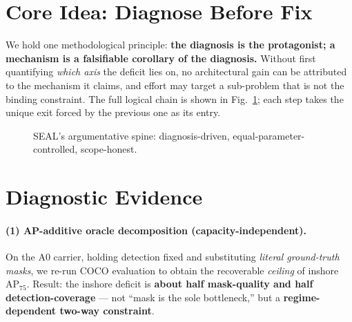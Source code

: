 \documentclass[11pt,a4paper]{article}
\begin{document}
\section{Core Idea: Diagnose Before Fix}
We hold one methodological principle: \textbf{the diagnosis is the protagonist; a mechanism is a
falsifiable corollary of the diagnosis.} Without first quantifying \emph{which axis} the deficit lies
on, no architectural gain can be attributed to the mechanism it claims, and effort may target a
sub-problem that is not the binding constraint. The full logical chain is shown in
Fig.~\ref{fig:arc}; each step takes the unique exit forced by the previous one as its entry.

\begin{figure}[h]
\centering
{}
\caption{SEAL's argumentative spine: diagnosis-driven, equal-parameter-controlled, scope-honest.}
\label{fig:arc}
\end{figure}

\section{Diagnostic Evidence}
\paragraph{(1) AP-additive oracle decomposition (capacity-independent).} On the A0 carrier, holding
detection fixed and substituting \emph{literal ground-truth masks}, we re-run COCO evaluation to obtain
the recoverable \emph{ceiling} of inshore AP$_{75}$. Result: the inshore deficit is \textbf{about half
mask-quality and half detection-coverage} --- not ``mask is the sole bottleneck,'' but a
\textbf{regime-dependent two-way constraint}.
\end{document}

